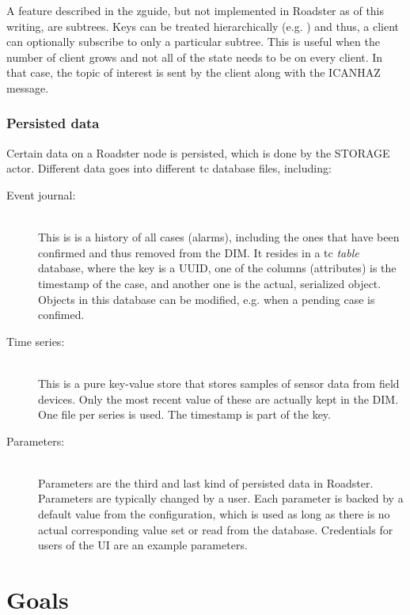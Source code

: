 A feature described in the \gls{zguide}, but not implemented in Roadster as of
this writing, are subtrees.
Keys can be treated hierarchically (e.g. ) and thus, a
client can optionally subscribe to only a particular subtree. This is useful
when the number of client grows and not all of the state needs to be on every
client. In that case, the topic of interest is sent by the client along with
the ICANHAZ message.


\subsubsection{Persisted data}
Certain data on a Roadster node is persisted, which is done by the STORAGE
actor. Different data goes into different \gls{tc} database files, including:

\begin{description}
	\item [ Event journal: ] \hfill\\
		This is is a history of all cases (alarms), including the ones
		that have been confirmed and thus removed from the DIM. It
		resides in a \gls{tc} \emph{table} database, where the key is a
		\gls{UUID}, one of the columns (attributes) is the timestamp of
		the case, and another one is the actual, serialized 
		object. Objects in this database can be modified, e.g. when a
		pending case is confimed.

	\item [ Time series: ] \hfill\\
		This is a pure key-value store that stores samples of sensor
		data from field devices. Only the most recent value of these
		are actually kept in the DIM. One file per series is used. The
		timestamp is part of the key.

	\item [ Parameters: ] \hfill\\
		Parameters are the third and last kind of persisted data in
		Roadster. Parameters are typically changed by a user. Each
		parameter is backed by a default value from the configuration,
		which is used as long as there is no actual corresponding value
		set or read from the database. Credentials for users of the UI
		are an example parameters.
\end{description}

\section{Goals}

